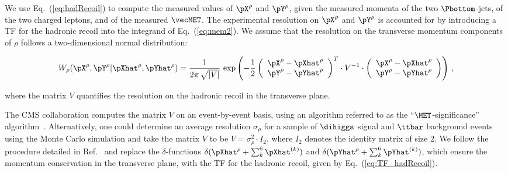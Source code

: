 We use Eq.~(\ref{eq:hadRecoil}) to compute the measured values of $\pX^{\rho}$ and $\pY^{\rho}$, 
given the measured momenta of the two $\Pbottom$-jets, of the two charged leptons, and of the measured $\vecMET$.
The experimental resolution on $\pX^{\rho}$ and $\pY^{\rho}$ is accounted for by introducing a TF for the hadronic recoil into the integrand of Eq.~(\ref{eq:mem2}).
We assume that the resolution on the transverse momentum components of $\rho$ follows a two-dimensional normal distribution:
\begin{linenowrapper}
\begin{equation}
W_{\rho}( \pX^{\rho},\pY^{\rho} | \pXhat^{\rho},\pYhat^{\rho} ) = 
 \frac{1}{2\pi \, \sqrt{\vert V \vert}} \, \exp \left( -\frac{1}{2}
 \left( \begin{array}{c} \pX^{\rho} - \pXhat^{\rho} \\ \pY^{\rho} - \pYhat^{\rho} \end{array} \right)^{T}
  \cdot V^{-1} \cdot
   \left( \begin{array}{c} \pX^{\rho} - \pXhat^{\rho} \\ \pY^{\rho} - \pYhat^{\rho} \end{array} \right)
 \right) \, ,
\label{eq:TF_hadRecoil}
\end{equation}
\end{linenowrapper}
where the matrix $V$ quantifies the resolution on the hadronic recoil in the transverse plane.

The CMS collaboration computes the matrix $V$ on an event-by-event basis, using an algorithm referred to as the ``$\MET$-significance'' algorithm~\cite{JME-10-009}.
Alternatively, one could determine an average resolution $\sigma_{\rho}$ for a sample of $\dihiggs$ signal and $\ttbar$ background events using the Monte Carlo simulation
and take the matrix $V$ to be $V = \sigma_{\rho}^{2} \cdot I_{2}$, where $I_{2}$ denotes the identity matrix of size $2$.
We follow the procedure detailed in Ref.~\cite{SVfitMEM} and replace the $\delta$-functions 
$\delta( \pXhat^{\rho} + \sum_{k}^{6} \pXhat^{(k)})$ and $\delta( \pYhat^{\rho} + \sum_{k}^{6} \pYhat^{(k)})$,
which ensure the momentum conservation in the transverse plane,
with the TF for the hadronic recoil, given by Eq.~(\ref{eq:TF_hadRecoil}).

